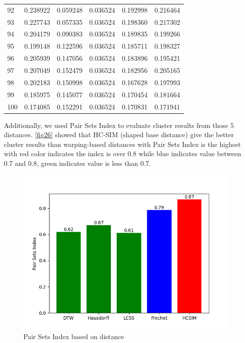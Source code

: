 \documentclass[a4paper, 12pt]{article}
\begin{document}
\begin{tabularx}{\linewidth}{|X|X|X|X|X|X|}
        92 & 0.238922 & 0.059248 & 0.036524 & 0.192998 & 0.216464 \\
        93 & 0.227743 & 0.057335 & 0.036524 & 0.198360 & 0.217302 \\
        94 & 0.204179 & 0.090383 & 0.036524 & 0.189835 & 0.199266 \\
        95 & 0.199148 & 0.122596 & 0.036524 & 0.185711 & 0.198327 \\
        96 & 0.205939 & 0.147056 & 0.036524 & 0.183896 & 0.195421 \\
        97 & 0.207049 & 0.152479 & 0.036524 & 0.182956 & 0.205165 \\
        98 & 0.202183 & 0.150998 & 0.036524 & 0.167628 & 0.197993 \\
        99 & 0.185975 & 0.145077 & 0.036524 & 0.170454 & 0.181664 \\
        100 & 0.174085 & 0.152291 & 0.036524 & 0.170831 & 0.171941
    \label{table:mopsi_silhouette}
\end{tabularx}
    
Additionally, we used Pair Sets Index to evaluate cluster results from those 5 distances. \autoref{fig26} showed that HC-SIM (shaped base distance) give the better cluster results than warping-based distances with Pair Sets Index is the highest with red color indicates the index is over 0.8 while blue indicates value between 0.7 and 0.8, green indicates value is less than 0.7.

\begin{figure}[htbp!]
    \centering
    \includegraphics[width=1\textwidth]{pair_sets_index.png}
    \caption{Pair Sets Index based on distance}
    \label{fig26}
\end{figure}
\end{document}
